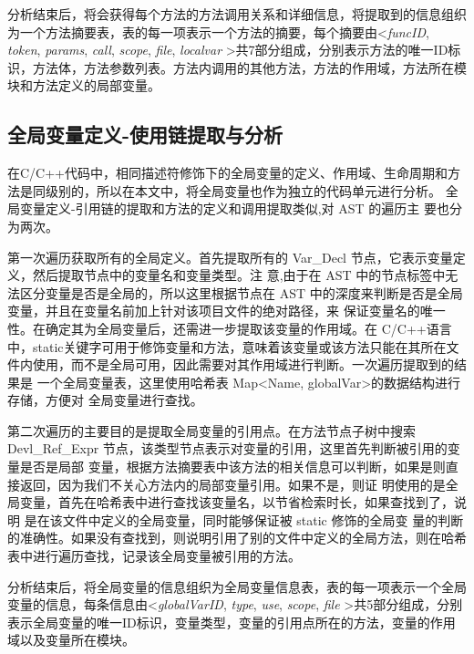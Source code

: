 分析结束后，将会获得每个方法的方法调用关系和详细信息，将提取到的信息组织为一个方法摘要表，表的每一项表示一个方法的摘要，每个摘要由\textless \textit{funcID}, \textit{token}, \textit{params}, \textit{call}, \textit{scope}, \textit{file}, \textit{localvar} \textgreater 共7部分组成，分别表示方法的唯一ID标识，方法体，方法参数列表。方法内调用的其他方法，方法的作用域，方法所在模块和方法定义的局部变量。


\subsection{全局变量定义-使用链提取与分析}
在C/C++代码中，相同描述符修饰下的全局变量的定义、作用域、生命周期和方法是同级别的，所以在本文中，将全局变量也作为独立的代码单元进行分析。
全局变量定义-引用链的提取和方法的定义和调用提取类似,对 AST 的遍历主
要也分为两次。


第一次遍历获取所有的全局定义。首先提取所有的
Var\_Decl 节点，它表示变量定义，然后提取节点中的变量名和变量类型。注
意,由于在 AST 中的节点标签中无法区分变量是否是全局的，所以这里根据节点在 AST
中的深度来判断是否是全局变量，并且在变量名前加上针对该项目文件的绝对路径，来
保证变量名的唯一性。在确定其为全局变量后，还需进一步提取该变量的作用域。在
C/C++语言中，static关键字可用于修饰变量和方法，意味着该变量或该方法只能在其所在文
件内使用，而不是全局可用，因此需要对其作用域进行判断。一次遍历提取到的结果是
一个全局变量表，这里使用哈希表 Map<Name, globalVar>的数据结构进行存储，方便对
全局变量进行查找。

第二次遍历的主要目的是提取全局变量的引用点。在方法节点子树中搜索
Devl\_Ref\_Expr 节点，该类型节点表示对变量的引用，这里首先判断被引用的变量是否是局部
变量，根据方法摘要表中该方法的相关信息可以判断，如果是则直接返回，因为我们不关心方法内的局部变量引用。如果不是，则证
明使用的是全局变量，首先在哈希表中进行查找该变量名，以节省检索时长，如果查找到了，说明
是在该文件中定义的全局变量，同时能够保证被 static 修饰的全局变
量的判断的准确性。如果没有查找到，则说明引用了别的文件中定义的全局方法，则在哈希
表中进行遍历查找，记录该全局变量被引用的方法。

分析结束后，将全局变量的信息组织为全局变量信息表，表的每一项表示一个全局变量的信息，每条信息由\textless \textit{globalVarID}, \textit{type}, \textit{use}, \textit{scope}, \textit{file}  \textgreater 共5部分组成，分别表示全局变量的唯一ID标识，变量类型，变量的引用点所在的方法，变量的作用域以及变量所在模块。



